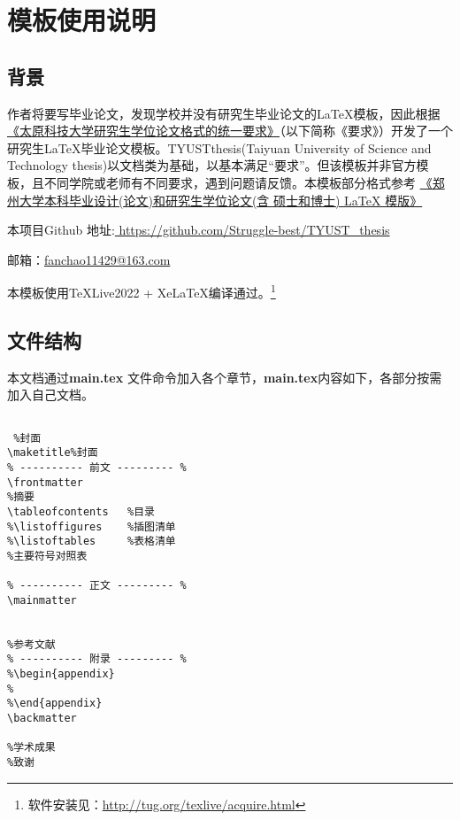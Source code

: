 \linespread{1.55}\selectfont
\chapter{模板使用说明}
\section{背景}
作者将要写毕业论文，发现学校并没有研究生毕业论文的\LaTeX 模板，因此根据\href{https://yjsxy.tyust.edu.cn/info/1172/3275.html}{《太原科技大学研究生学位论文格式的统一要求》}（以下简称《要求》）开发了一个研究生\LaTeX 毕业论文模板。TYUSTthesis(Taiyuan University of Science and Technology thesis)以文档类为基础，以基本满足“要求”。但该模板并非官方模板，且不同学院或老师有不同要求，遇到问题请反馈。本模板部分格式参考
\href{https://github.com/tuxify/zzuthesis}{《郑州大学本科毕业设计(论文)和研究生学位论文(含 硕士和博士) LaTeX 模版》}

本项目Github 地址\faGithub :\href{https://github.com/Struggle-best/TYUST_thesis}{ \;\;https://github.com/Struggle-best/TYUST\_thesis}

邮箱：\href{fanchao11429@163.com}{fanchao11429@163.com}

本模板使用\TeX Live2022 + Xe\LaTeX 编译通过。\footnote{软件安装见：\url{http://tug.org/texlive/acquire.html}}
\section{文件结构}
本文档通过\textbf{main.tex} 文件\myverb{}命令加入各个章节，\textbf{main.tex}内容如下，各部分按需加入自己文档。

\begin{lstlisting}

 %封面
\maketitle%封面
% ---------- 前文 --------- %
\frontmatter
%摘要
\tableofcontents   %目录
%\listoffigures    %插图清单
%\listoftables     %表格清单
%主要符号对照表

% ---------- 正文 --------- %
\mainmatter


%参考文献
% ---------- 附录 --------- %
%\begin{appendix}
%	
%\end{appendix}
\backmatter

%学术成果
%致谢

\end{lstlisting}
